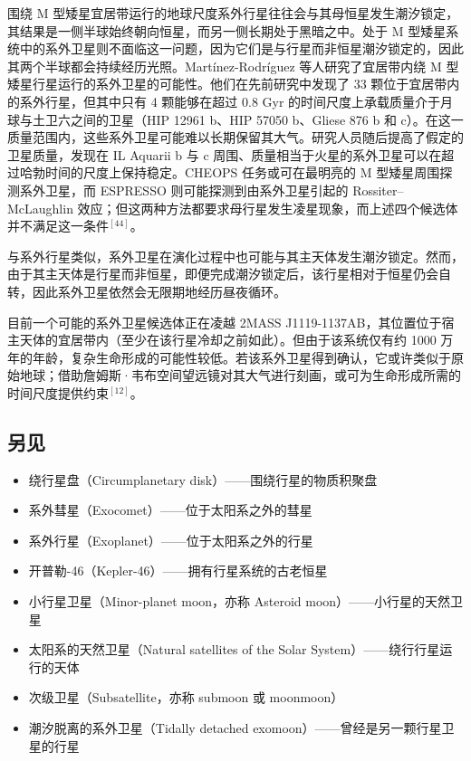 围绕 M 型矮星宜居带运行的地球尺度系外行星往往会与其母恒星发生潮汐锁定，其结果是一侧半球始终朝向恒星，而另一侧长期处于黑暗之中。处于 M 型矮星系统中的系外卫星则不面临这一问题，因为它们是与行星而非恒星潮汐锁定的，因此其两个半球都会持续经历光照。Martínez-Rodríguez 等人研究了宜居带内绕 M 型矮星行星运行的系外卫星的可能性。他们在先前研究中发现了 33 颗位于宜居带内的系外行星，但其中只有 4 颗能够在超过 0.8 Gyr 的时间尺度上承载质量介于月球与土卫六之间的卫星（HIP 12961 b、HIP 57050 b、Gliese 876 b 和 c）。在这一质量范围内，这些系外卫星可能难以长期保留其大气。研究人员随后提高了假定的卫星质量，发现在 IL Aquarii b 与 c 周围、质量相当于火星的系外卫星可以在超过哈勃时间的尺度上保持稳定。CHEOPS 任务或可在最明亮的 M 型矮星周围探测系外卫星，而 ESPRESSO 则可能探测到由系外卫星引起的 Rossiter–McLaughlin 效应；但这两种方法都要求母行星发生凌星现象，而上述四个候选体并不满足这一条件$^{[44]}$。

与系外行星类似，系外卫星在演化过程中也可能与其主天体发生潮汐锁定。然而，由于其主天体是行星而非恒星，即便完成潮汐锁定后，该行星相对于恒星仍会自转，因此系外卫星依然会无限期地经历昼夜循环。

目前一个可能的系外卫星候选体正在凌越 2MASS J1119-1137AB，其位置位于宿主天体的宜居带内（至少在该行星冷却之前如此）。但由于该系统仅有约 1000 万年的年龄，复杂生命形成的可能性较低。若该系外卫星得到确认，它或许类似于原始地球；借助詹姆斯·韦布空间望远镜对其大气进行刻画，或可为生命形成所需的时间尺度提供约束$^{[12]}$。
\subsection{另见}
\begin{itemize}
\item 绕行星盘（Circumplanetary disk）——围绕行星的物质积聚盘
\item 系外彗星（Exocomet）——位于太阳系之外的彗星
\item 系外行星（Exoplanet）——位于太阳系之外的行星
\item 开普勒-46（Kepler-46）——拥有行星系统的古老恒星
\item 小行星卫星（Minor-planet moon，亦称 Asteroid moon）——小行星的天然卫星
\item 太阳系的天然卫星（Natural satellites of the Solar System）——绕行行星运行的天体
\item 次级卫星（Subsatellite，亦称 submoon 或 moonmoon）
\item 潮汐脱离的系外卫星（Tidally detached exomoon）——曾经是另一颗行星卫星的行星
\end{itemize}